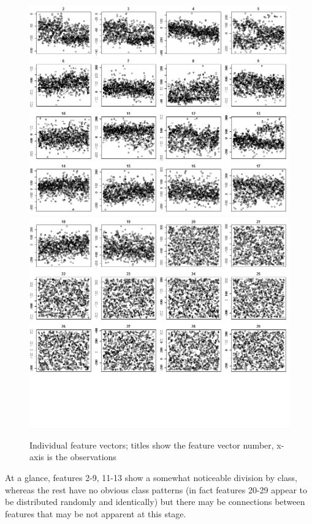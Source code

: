 \documentclass[11pt, a4paper]{article}
\begin{document}
\begin{figure}[H]
\centering
	\includegraphics[scale=0.4]{featurevectors1.jpeg}
	\includegraphics[scale=0.4,trim={0 6cm 0 0},clip]{featurevectors2.jpeg}
\caption{Individual feature vectors; titles show the feature vector number, x-axis is the observations}
\end{figure}

At a glance, features 2-9, 11-13 show a somewhat noticeable division by class, whereas the rest have no obvious class patterns (in fact features 20-29 appear to be distributed randomly and identically) but there may be connections between features that may be not apparent at this stage.
\end{document}
